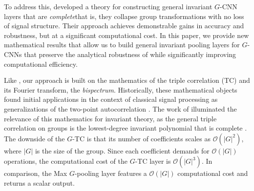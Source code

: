 \documentclass{article}
\theoremstyle{plain}
\theoremstyle{definition}
\theoremstyle{remark}
\begin{document}
To address this, \citet{sanborn2023general} developed a theory for constructing general invariant $G$-CNN layers that are \textit{complete}\textemdash that is, they collapse group transformations with no loss of signal structure. Their approach achieves demonstrable gains in accuracy and robustness, but at a significant computational cost. In this paper, we provide new mathematical results that allow us to build general invariant pooling layers for $G$-CNNs that preserve the analytical robustness of \citet{sanborn2023general} while significantly improving computational efficiency.

Like \citet{sanborn2023general}, our approach is built on the mathematics of the triple correlation (TC)
and its Fourier transform, the \emph{bispectrum}. Historically, these mathematical objects found initial applications in the context of classical signal processing as generalizations of the two-point autocorrelation \cite{tukey1953spectral, brillinger1991some, nikias1993signal}. The work of \citet{kakarala_thesis} illuminated the relevance of this mathematics for invariant theory, as the general triple correlation on groups
is the lowest-degree invariant polynomial that is complete
\cite{sturmfels2008algorithms}. The downside of the $G$-TC is that its number of coefficients scales as $\mathcal{O}(|G|^2)$, where $|G|$ is the size of the group. Since each coefficient demands for $\mathcal{O}(|G|)$ operations, the computational cost of the $G$-TC layer is $\mathcal{O}(|G|^3)$. In comparison, the Max $G$-pooling layer features a $\mathcal{O}(|G|)$ computational cost and returns a scalar output.



\end{document}
